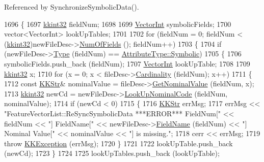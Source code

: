 Referenced by Synchronize\+Symbolic\+Data().


\begin{DoxyCode}
1696 \{
1697   \hyperlink{namespace_k_k_b_a8fa4952cc84fda1de4bec1fbdd8d5b1b}{kkint32}  fieldNum;
1698 
1699   \hyperlink{namespace_k_k_b_a791ebe73f89917067a7aab9dbd817e45}{VectorInt}  symbolicFields;
1700   vector<VectorInt>  lookUpTables;
1701 
1702   \textcolor{keywordflow}{for}  (fieldNum = 0;  fieldNum < (\hyperlink{namespace_k_k_b_a8fa4952cc84fda1de4bec1fbdd8d5b1b}{kkint32})newFileDesc->\hyperlink{class_k_k_m_l_l_1_1_file_desc_a07abdfb77949dee565c555c7651581c2}{NumOfFields} ();  fieldNum++)
1703   \{
1704     \textcolor{keywordflow}{if}  (newFileDesc->\hyperlink{class_k_k_m_l_l_1_1_file_desc_a4d84c65489e2ac36e91cb1d8a34adb89}{Type} (fieldNum) == \hyperlink{namespace_k_k_m_l_l_a99973706982b59debba670e2480555abaaddee1396a3e20ceea8071ed6da54866}{AttributeType::Symbolic})
1705     \{
1706       symbolicFields.push\_back (fieldNum);
1707       \hyperlink{namespace_k_k_b_a791ebe73f89917067a7aab9dbd817e45}{VectorInt}  lookUpTable;
1708 
1709       \hyperlink{namespace_k_k_b_a8fa4952cc84fda1de4bec1fbdd8d5b1b}{kkint32}  x;
1710       \textcolor{keywordflow}{for}  (x = 0;  x < fileDesc->\hyperlink{class_k_k_m_l_l_1_1_file_desc_a58a548ebb87bfc265d05208871390f54}{Cardinality} (fieldNum);  x++)
1711       \{
1712         \textcolor{keyword}{const} \hyperlink{class_k_k_b_1_1_k_k_str}{KKStr}&  nominalValue = fileDesc->\hyperlink{class_k_k_m_l_l_1_1_file_desc_a732930fe4786f35e1b9428c90c05d61c}{GetNominalValue} (fieldNum, x);
1713         \hyperlink{namespace_k_k_b_a8fa4952cc84fda1de4bec1fbdd8d5b1b}{kkint32}  newCd = newFileDesc->\hyperlink{class_k_k_m_l_l_1_1_file_desc_a59b0335b54bccce30a3838d463a84ba3}{LookUpNominalCode} (fieldNum, nominalValue);
1714         \textcolor{keywordflow}{if}  (newCd < 0)
1715         \{
1716           \hyperlink{class_k_k_b_1_1_k_k_str}{KKStr}  errMsg;
1717           errMsg << \textcolor{stringliteral}{"FeatureVectorList::ReSyncSymbolicData  ***ERROR***    FieldNum["} << fieldNum << \textcolor{stringliteral}{"] 
       FieldName["} << newFileDesc->\hyperlink{class_k_k_m_l_l_1_1_file_desc_a703b2f8283fc0cd4dfbf03308a9d0938}{FieldName} (fieldNum) << \textcolor{stringliteral}{"]  Nominal Value["} << nominalValue << \textcolor{stringliteral}{"]    is
       missing."};
1718           cerr << errMsg;
1719           \textcolor{keywordflow}{throw} \hyperlink{class_k_k_b_1_1_k_k_exception}{KKException} (errMsg);
1720         \}
1721 
1722         lookUpTable.push\_back (newCd);
1723       \}
1724 
1725       lookUpTables.push\_back (lookUpTable);

\end{DoxyCode}
